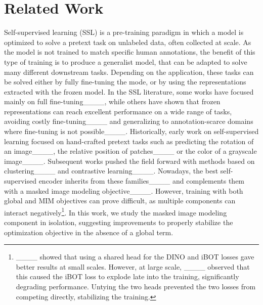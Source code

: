 \section{Related Work}
\label{sec:related}

Self-supervised learning (SSL) is a pre-training paradigm in which a model is optimized to solve a pretext task on unlabeled data, often collected at scale.
As the model is not trained to match specific human annotations, the benefit of this type of training is to produce a generalist model, that can be adapted to solve many different downstream tasks.
Depending on the application, these tasks can be solved either by fully fine-tuning the mode, or by using the representations extracted with the frozen model.
In the SSL literature, some works have focused mainly on full fine-tuning____, while others have shown that frozen representations can reach excellent performance on a wide range of tasks, avoiding costly fine-tuning____ and generalizing to annotation-scarce domains where fine-tuning is not possible____.
Historically, early work on self-supervised learning focused on hand-crafted pretext tasks such as predicting the rotation of an image____, the relative position of patches____ or the color of a grayscale image____.
Subsequent works pushed the field forward with methods based on clustering____ and contrastive learning____.
Nowadays, the best self-supervised encoder inherits from these families____ and complements them with a masked image modeling objective____.
However, training with both global and MIM objectives can prove difficult, as multiple components can interact negatively\footnote{
____ showed that using a shared head for the DINO and iBOT losses gave better results at small scales.
However, at large scale, ____ observed that this caused the iBOT loss to explode late into the training, significantly degrading performance.
Untying the two heads prevented the two losses from competing directly, stabilizing the training.
}.
In this work, we study the masked image modeling component in isolation, suggesting improvements to properly stabilize the optimization objective in the absence of a global term.

